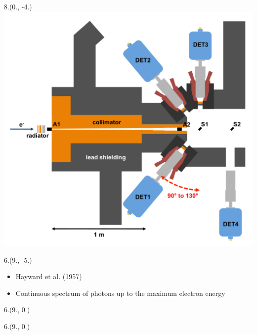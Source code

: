



\begin{textblock}{8.}(0., -4.)
    \includegraphics[width=\textwidth]{figures/dhips.pdf}
\end{textblock}

\begin{textblock}{6.}(9., -5.)
    \begin{itemize}
        \item Hayward et al. (1957)
        \item Continuous spectrum of photons up to the maximum electron energy
    \end{itemize}
\end{textblock}

\def \SPECTRUMX {9.}
\def \SPECTRUMY {0.}

\begin{textblock}{6.}(\SPECTRUMX, \SPECTRUMY)
\end{textblock}

\begin{textblock}{6.}(\SPECTRUMX, \SPECTRUMY)
\end{textblock}